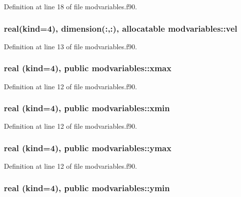 Definition at line 18 of file modvariables.\-f90.

\hypertarget{classmodvariables_a9f11e44143a4c5cd47740e58712bbe1c}{
\subsubsection[{vel}]{\setlength{\rightskip}{0pt plus 5cm}real(kind=4), dimension(\-:,\-:), allocatable modvariables\-::vel}}\label{classmodvariables_a9f11e44143a4c5cd47740e58712bbe1c}


Definition at line 13 of file modvariables.\-f90.

\hypertarget{classmodvariables_aa6894507e1844677f7c2908093f61950}{
\subsubsection[{xmax}]{\setlength{\rightskip}{0pt plus 5cm}real (kind=4), public modvariables\-::xmax}}\label{classmodvariables_aa6894507e1844677f7c2908093f61950}


Definition at line 12 of file modvariables.\-f90.

\hypertarget{classmodvariables_afe10f659f4ebb9350a8ecd40e8d3716d}{
\subsubsection[{xmin}]{\setlength{\rightskip}{0pt plus 5cm}real (kind=4), public modvariables\-::xmin}}\label{classmodvariables_afe10f659f4ebb9350a8ecd40e8d3716d}


Definition at line 12 of file modvariables.\-f90.

\hypertarget{classmodvariables_af6d344bd3756f326eb587c1497871da7}{
\subsubsection[{ymax}]{\setlength{\rightskip}{0pt plus 5cm}real (kind=4), public modvariables\-::ymax}}\label{classmodvariables_af6d344bd3756f326eb587c1497871da7}


Definition at line 12 of file modvariables.\-f90.

\hypertarget{classmodvariables_acac6fa087befdc79eb687a91bc4a9efa}{
\subsubsection[{ymin}]{\setlength{\rightskip}{0pt plus 5cm}real (kind=4), public modvariables\-::ymin}}\label{classmodvariables_acac6fa087befdc79eb687a91bc4a9efa}


